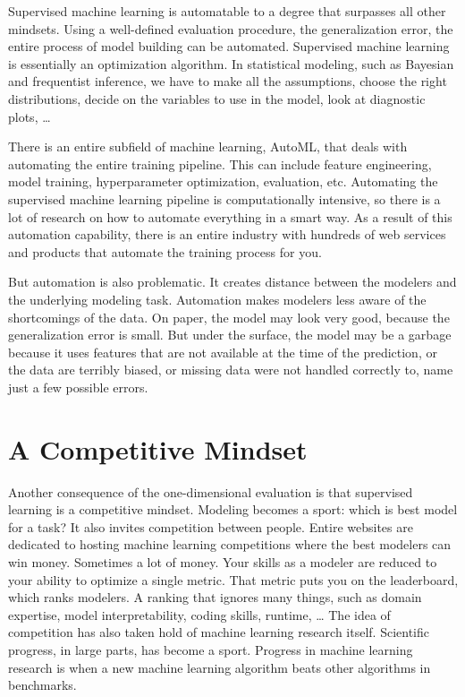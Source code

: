 \documentclass[
  10pt,
]{scrbook}
\begin{document}
Supervised machine learning is automatable to a degree that surpasses all other mindsets.
Using a well-defined evaluation procedure, the generalization error, the entire process of model building can be automated.
Supervised machine learning is essentially an optimization algorithm.
In statistical modeling, such as Bayesian and frequentist inference, we have to make all the assumptions, choose the right distributions, decide on the variables to use in the model, look at diagnostic plots, \ldots{}

There is an entire subfield of machine learning, AutoML, that deals with automating the entire training pipeline.
This can include feature engineering, model training, hyperparameter optimization, evaluation, etc.
Automating the supervised machine learning pipeline is computationally intensive, so there is a lot of research on how to automate everything in a smart way.
As a result of this automation capability, there is an entire industry with hundreds of web services and products that automate the training process for you.

But automation is also problematic.
It creates distance between the modelers and the underlying modeling task.
Automation makes modelers less aware of the shortcomings of the data.
On paper, the model may look very good, because the generalization error is small.
But under the surface, the model may be a garbage because it uses features that are not available at the time of the prediction, or the data are terribly biased, or missing data were not handled correctly to, name just a few possible errors.

\hypertarget{a-competitive-mindset}{%
\section{A Competitive Mindset}\label{a-competitive-mindset}}

Another consequence of the one-dimensional evaluation is that supervised learning is a competitive mindset.
Modeling becomes a sport: which is best model for a task?
It also invites competition between people.
Entire websites are dedicated to hosting machine learning competitions where the best modelers can win money.
Sometimes a lot of money.
Your skills as a modeler are reduced to your ability to optimize a single metric.
That metric puts you on the leaderboard, which ranks modelers.
A ranking that ignores many things, such as domain expertise, model interpretability, coding skills, runtime, \ldots{}
The idea of competition has also taken hold of machine learning research itself.
Scientific progress, in large parts, has become a sport.
Progress in machine learning research is when a new machine learning algorithm beats other algorithms in benchmarks.
\end{document}
